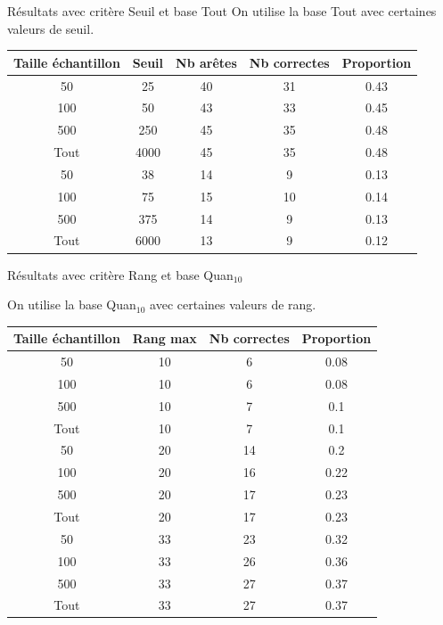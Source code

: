 \documentclass{beamer}
\begin{document}
\begin{frame}{Résultats avec critère Seuil et base Tout}
On utilise la base Tout avec certaines valeurs de seuil.
\begin{tabular}{|c|c|c|c|c|}
   \hline
   Taille échantillon & Seuil & Nb arêtes & Nb correctes & Proportion\\
   \hline
   50 & 25 & 40 & 31 & 0.43  \\
   \hline
   100 & 50 & 43 & 33 & 0.45  \\
   \hline
   500 & 250 & 45 & 35 & 0.48  \\
   \hline
   Tout & 4000 & 45 & 35 & 0.48 \\
   \hline
   50 & 38 & 14 & 9 & 0.13  \\
   \hline
   100 & 75 & 15 & 10 & 0.14  \\
   \hline
   500 & 375 & 14 & 9 & 0.13  \\
   \hline
   Tout & 6000 & 13 & 9 & 0.12 \\
   \hline
\end{tabular}
\end{frame}


\begin{frame}{Résultats avec critère Rang et base Quan$_{10}$}

On utilise la base Quan$_{10}$ avec certaines valeurs de rang.
\begin{tabular}{|c|c|c|c|}
   \hline
   Taille échantillon & Rang max & Nb correctes & Proportion\\
   \hline
   50 & 10  & 6 & 0.08  \\
   \hline
   100 & 10  & 6 & 0.08  \\
   \hline
   500 & 10  & 7 & 0.1  \\
   \hline
   Tout & 10 & 7 & 0.1 \\
   \hline
   50 & 20 & 14 & 0.2  \\
   \hline
   100 & 20 & 16 & 0.22  \\
   \hline
   500 & 20 & 17 & 0.23  \\
   \hline
   Tout & 20 & 17 & 0.23 \\
   \hline
   50 & 33 & 23 & 0.32  \\
   \hline
   100 & 33 & 26 & 0.36  \\
   \hline
   500 & 33 & 27 & 0.37  \\
   \hline
   Tout & 33 & 27 & 0.37 \\
   \hline
\end{tabular}

\end{frame}
\end{document}
